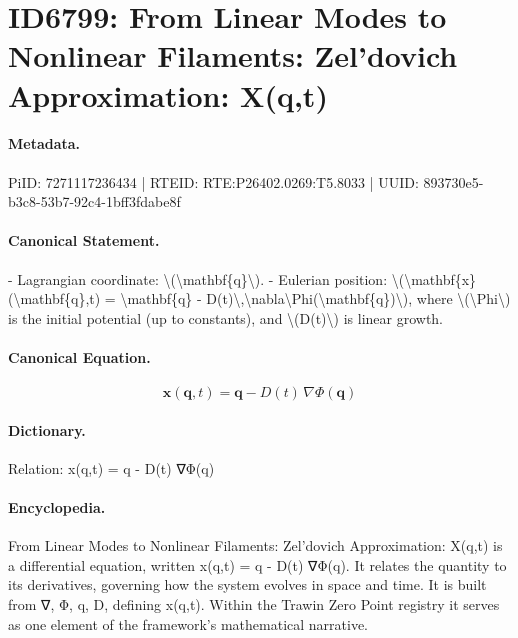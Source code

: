 \section*{ID6799: From Linear Modes to Nonlinear Filaments: Zel’dovich Approximation: X(q,t)}
\paragraph{Metadata.}
PiID: 7271117236434 | RTEID: RTE:P26402.0269:T5.8033 | UUID: 893730e5-b3c8-53b7-92c4-1bff3fdabe8f

\paragraph{Canonical Statement.}
- Lagrangian coordinate: \textbackslash{}(\textbackslash{}mathbf\{q\}\textbackslash{}). - Eulerian position: \textbackslash{}(\textbackslash{}mathbf\{x\}(\textbackslash{}mathbf\{q\},t) = \textbackslash{}mathbf\{q\} - D(t)\textbackslash{},\textbackslash{}nabla\textbackslash{}Phi(\textbackslash{}mathbf\{q\})\textbackslash{}), where \textbackslash{}(\textbackslash{}Phi\textbackslash{}) is the initial potential (up to constants), and \textbackslash{}(D(t)\textbackslash{}) is linear growth.

\paragraph{Canonical Equation.}
\[
\mathbf{x}(\mathbf{q},t) = \mathbf{q} - D(t)\,\nabla\Phi(\mathbf{q})
\]

\paragraph{Dictionary.}
Relation: x(q,t) = q - D(t) ∇Φ(q)

\paragraph{Encyclopedia.}
From Linear Modes to Nonlinear Filaments: Zel’dovich Approximation: X(q,t) is a differential equation, written x(q,t) = q - D(t) ∇Φ(q). It relates the quantity to its derivatives, governing how the system evolves in space and time. It is built from ∇, Φ, q, D, defining x(q,t). Within the Trawin Zero Point registry it serves as one element of the framework's mathematical narrative.
